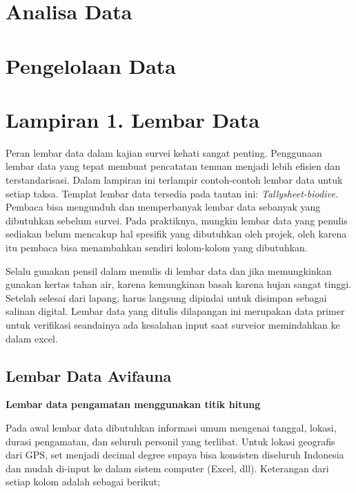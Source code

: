 \documentclass[
]{book}
\begin{document}
\hypertarget{analisa-data}{%
\chapter*{Analisa Data}\label{analisa-data}}

\hypertarget{pengelolaan-data}{%
\chapter*{Pengelolaan Data}\label{pengelolaan-data}}

\hypertarget{lampiran-1.-lembar-data}{%
\chapter*{Lampiran 1. Lembar Data}\label{lampiran-1.-lembar-data}}

Peran lembar data dalam kajian survei kehati sangat penting. Penggunaan lembar data yang tepat membuat pencatatan temuan menjadi lebih efisien dan terstandarisasi. Dalam lampiran ini terlampir contoh-contoh lembar data untuk setiap taksa. Templat lembar data tersedia pada tautan ini: \emph{Tallysheet-biodive}. Pembaca bisa mengunduh dan memperbanyak lembar data sebanyak yang dibutuhkan sebelum survei. Pada praktiknya, mungkin lembar data yang penulis sediakan belum mencakup hal spesifik yang dibutuhkan oleh projek, oleh karena itu pembaca bisa menambahkan sendiri kolom-kolom yang dibutuhkan.

Selalu gunakan pensil dalam menulis di lembar data dan jika memungkinkan gunakan kertas tahan air, karena kemungkinan basah karena hujan sangat tinggi. Setelah selesai dari lapang, harus langsung dipindai untuk disimpan sebagai salinan digital. Lembar data yang ditulis dilapangan ini merupakan data primer untuk verifikasi seandainya ada kesalahan input saat surveior memindahkan ke dalam excel.

\hypertarget{lembar-data-avifauna}{%
\section*{Lembar Data Avifauna}\label{lembar-data-avifauna}}

\textbf{Lembar data pengamatan menggunakan titik hitung}

Pada awal lembar data dibutuhkan informasi umum mengenai tanggal, lokasi, durasi pengamatan, dan seluruh personil yang terlibat. Untuk lokasi geografis dari GPS, set menjadi decimal degree supaya bisa konsisten diseluruh Indonesia dan mudah di-input ke dalam sistem computer (Excel, dll). Keterangan dari setiap kolom adalah sebagai berikut;
\end{document}

